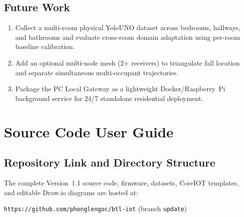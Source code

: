 \documentclass{hcmut-report}
\begin{document}
\subsection{Future Work}
\begin{enumerate}
  \item Collect a multi-room physical YoloUNO dataset across bedrooms, hallways, and bathrooms and evaluate cross-room domain adaptation using per-room baseline calibration.
  \item Add an optional multi-node mesh (2+ receivers) to triangulate fall location and separate simultaneous multi-occupant trajectories.
  \item Package the PC Local Gateway as a lightweight Docker/Raspberry~Pi background service for 24/7 standalone residential deployment.
\end{enumerate}

\section{Source Code User Guide}

\subsection{Repository Link and Directory Structure}
The complete Version~1.1 source code, firmware, datasets, CoreIOT templates, and editable Draw.io diagrams are hosted at:
\begin{center}
\texttt{https://github.com/phonglengoc/btl-iot} \quad (branch \texttt{update})
\end{center}
\end{document}
